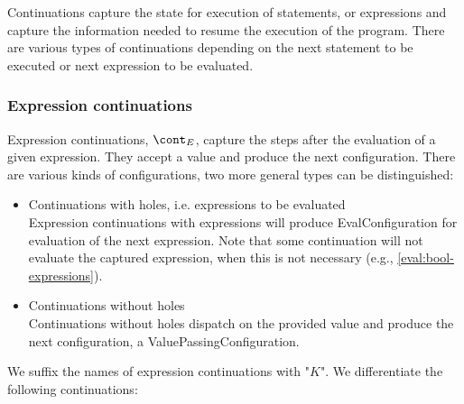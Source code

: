 \documentclass{article}
\begin{document}
Continuations capture the state for execution of statements, or expressions and capture the information needed to resume the execution of the program.
There are various types of continuations depending on the next statement to be executed or next expression to be evaluated.
\subsubsection{Expression continuations}
\label{subsubsec:expression-continuations}

Expression continuations, $\econt$, capture the steps after the evaluation of a given expression. They accept a value and produce the next configuration. 
There are various kinds of configurations, two more general types can be distinguished:
\begin{itemize}
\item Continuations with holes, i.e. expressions to be evaluated\\
Expression continuations with expressions will produce EvalConfiguration for evaluation of the next expression.
Note that some continuation will not evaluate the captured expression, when this is not necessary (e.g., \ref{eval:bool-expressions}).

\item Continuations without holes\\
Continuations without holes dispatch on the provided value and produce the next configuration, a ValuePassingConfiguration.
\end{itemize}
We suffix the names of expression continuations with "$K$". We differentiate the following continuations:
%
\newcommand{\ExceptionHandlersRest}{\handler,\,\cstrace,\,\cex}
\newcommand{\ExceptionHandlers}{\strace,\,\handler,\,\cstrace,\,\cex}
\newcommand{\VarSetK}[3]{\mathrm{VarSetK}({#1},\,{#2},\,{#3})}
\newcommand{\ExpressionsK}[3]{\mathrm{ExpressionsK}({#1},\,{#2},\,\ExceptionHandlers,\,{#3})}
%
\newcommand{\NotK}[1]{\mathrm{NotK}({#1})}
\newcommand{\AndK}[3]{\mathrm{AndK}({#1},\,{#2},\,\ExceptionHandlers,\,{#3})}
\newcommand{\OrK}[3]{\mathrm{OrK}({#1},\,{#2},\,\ExceptionHandlers,\,{#3})}
\newcommand{\ConditionalK}[4]{\mathrm{ConditionalK}({#1},\,{#2},\,{#3},\,\ExceptionHandlers,\,{#4})}
%
\newcommand{\LetK}[4]{\mathrm{LetK}({#1},\,{#2},\,{#3},\,\ExceptionHandlers,\,{#4})}
%
\newcommand{\IsExpressionK}{\mathrm{IsExpressionK}(\tt{T},\,\econt)}
\newcommand{\AsExpressionK}{\mathrm{AsExpressionK}(\tt{T},\,\strace,\,\handler,\,\econt)}
%
\newcommand{\StaticGetK}{\mathrm{StaticGetK}(\membermeta,\,\econt)}
\end{document}
